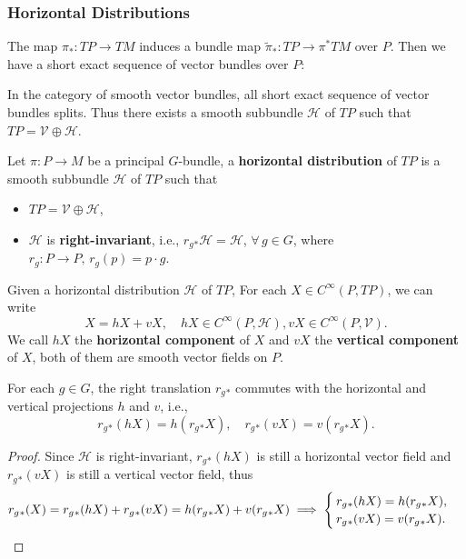 \subsubsection{Horizontal Distributions}
The map $\pi_*: TP\to TM$ induces a bundle map $\tilde{\pi}_*: TP\to \pi^*TM$ over $P$. 
Then we have a short exact sequence of vector bundles over $P$: 
\begin{center}
\end{center}
In the category of smooth vector bundles, all short exact sequence of vector bundles splits. 
Thus there exists a smooth subbundle $\mathcal{H}$ of $TP$ such that $TP = \mathcal{V}\oplus\mathcal{H}$.
\begin{definition}
    Let $\pi: P\to M$ be a principal $G$-bundle, 
    a \textbf{horizontal distribution} of $TP$ is a smooth subbundle $\mathcal{H}$ of $TP$ such that
    \begin{itemize}
        \item $TP = \mathcal{V}\oplus\mathcal{H}$, 
        \item $\mathcal{H}$ is \textbf{right-invariant}, i.e., $r_g{}_*\mathcal{H} = \mathcal{H}$, 
        $\forall\,g\in G$, where $r_g: P\to P,\, r_g(p) = p\cdot g$. 
    \end{itemize}
\end{definition}
\begin{definition}
    Given a horizontal distribution $\mathcal{H}$ of $TP$, For each $X\in C^\infty(P,TP)$, we can write 
    \begin{equation*}
        X = hX + vX, \quad hX\in C^\infty(P,\mathcal{H}), vX\in C^\infty(P,\mathcal{V}).
    \end{equation*}
    We call $hX$ the \textbf{horizontal component} of $X$ and $vX$ the \textbf{vertical component} of $X$,
    both of them are smooth vector fields on $P$.
\end{definition}
\begin{proposition}
    For each $g\in G$, the right translation $r_g{}_*$ commutes with the horizontal and vertical projections $h$ and $v$, i.e.,
    \begin{equation*}
        r_g{}_*(hX) = h(r_g{}_*X), \quad r_g{}_*(vX) = v(r_g{}_*X).
    \end{equation*} 
\end{proposition}
\begin{proof}
    Since $\mathcal{H}$ is right-invariant, $r_g{}_*(hX)$ is still a horizontal vector field 
    and $r_g{}_*(vX)$ is still a vertical vector field, thus 
    \begin{equation*}
        r_g{}_*(X) = r_g{}_*(hX) + r_g{}_*(vX) = h(r_g{}_*X) + v(r_g{}_*X)
        \implies 
        \begin{cases}
            r_g{}_*(hX) = h(r_g{}_*X), \\
            r_g{}_*(vX) = v(r_g{}_*X).
        \end{cases} \qedhere
    \end{equation*}
\end{proof}

